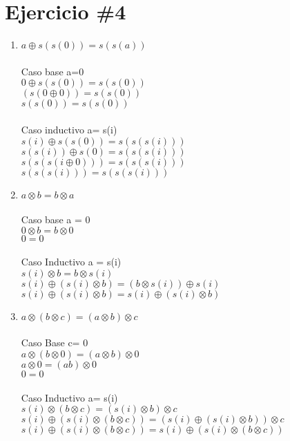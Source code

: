 \documentclass{article}
\begin{document}
\section{Ejercicio \#4}
\begin{enumerate}

\item{$a\oplus s(s(0))=s(s(a))$} 
\\\\Caso base a=0 
\\$0 \oplus s(s(0)) = s(s(0))$ 
\\$(s(0 \oplus 0)) =s(s(0))$
\\$s(s(0)) = s(s(0))$ 
\\\\Caso inductivo a= s(i) 
\\$s(i) \oplus s(s(0)) = s(s(s(i))) $ 
\\$s(s(i)) \oplus s(0) = s(s(s(i)))$ 
\\$s(s(s(i\oplus 0))) = s(s(s(i)))$ 
\\$s(s(s(i))) = s(s(s(i)))$

\item{$a \otimes b = b \otimes a$}
\\\\Caso base a = 0 
\\$0 \otimes b = b \otimes 0$ 
\\$0 = 0$ 
\\\\Caso Inductivo a = s(i)
\\$s(i) \otimes b = b \otimes s(i)$ 
\\$s(i) \oplus (s(i)\otimes b) = (b \otimes s(i)) \oplus s(i)$
\\$s(i) \oplus (s(i)\otimes b) = s(i) \oplus (s(i) \otimes b)$

\item{$a \otimes (b \otimes c)=(a\otimes b)\otimes c$}
\\\\Caso Base c= 0
\\$a \otimes (b\otimes 0) = (a \otimes b) \otimes 0$
\\$a \otimes 0  = (ab) \otimes 0$
\\$0=0$
\\\\Caso Inductivo a= s(i)
\\$s(i) \otimes (b \otimes c)=(s(i)\otimes b)\otimes c$
\\$s(i) \oplus (s(i) \otimes (b\otimes c)) = (s(i) \oplus (s(i) \otimes b)) \otimes c$
\\ $s(i) \oplus (s(i) \otimes (b\otimes c)) = s(i) \oplus (s(i) \otimes (b\otimes c))$ 


\end{enumerate}
\end{document}
